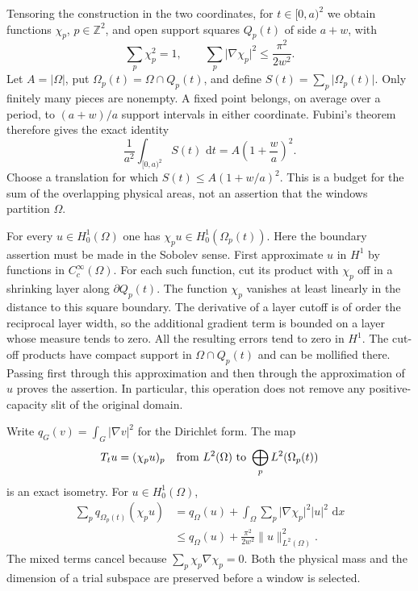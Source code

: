 \documentclass[11pt,reqno]{amsart}
\numberwithin{equation}{section}
\newcommand{\Z}{\mathbb Z}
\newcommand{\dd}{\,\mathrm d}
\newcommand{\abs}[1]{\lvert#1\rvert}
\newcommand{\norm}[1]{\lVert#1\rVert}
\newcommand{\Om}{\Omega}
\begin{document}
Tensoring the construction in the two coordinates, for
$t\in[0,a)^2$ we obtain functions $\chi_p$, $p\in\Z^2$, and
open support squares $Q_p(t)$ of side $a+w$, with
\begin{equation}
 \sum_p\chi_p^2=1,
 \qquad
 \sum_p\abs{\nabla\chi_p}^2\leq\frac{\pi^2}{2w^2}.
 \label{ims:partition}
\end{equation}
Let $A=\abs{\Om}$, put $\Om_p(t)=\Om\cap Q_p(t)$, and define
$S(t)=\sum_p\abs{\Om_p(t)}$.  Only finitely many pieces are
nonempty.  A fixed point belongs, on average over a period, to
$(a+w)/a$ support intervals in either coordinate.  Fubini's theorem
therefore gives the exact identity
\begin{equation}
 \frac1{a^2}\int_{[0,a)^2}S(t)\,\dd t
       =A\left(1+\frac wa\right)^2.
 \label{ims:area-average}
\end{equation}
Choose a translation for which
$S(t)\leq A(1+w/a)^2$.  This is a budget for the sum of the
overlapping physical areas, not an assertion that the windows
partition $\Om$.

For every $u\in H_0^1(\Om)$ one has
$\chi_pu\in H_0^1(\Om_p(t))$.  Here the boundary assertion must
be made in the Sobolev sense.  First approximate $u$ in $H^1$ by
functions in $C_c^\infty(\Om)$.  For each such function, cut its
product with $\chi_p$ off in a shrinking layer along
$\partial Q_p(t)$.  The function $\chi_p$ vanishes at least
linearly in the distance to this square boundary.  The derivative
of a layer cutoff is of order the reciprocal layer width, so the
additional gradient term is bounded on a layer whose measure tends
to zero.  All the resulting errors tend to zero in $H^1$.
The cut-off products have compact support in $\Om\cap Q_p(t)$
and can be mollified there.  Passing first through this approximation
and then through the approximation of $u$ proves the assertion.
In particular, this operation does not remove any positive-capacity
slit of the original domain.

Write $q_G(v)=\int_G\abs{\nabla v}^2$ for the Dirichlet form.
The map
\[
 T_tu=(\chi_pu)_p
 \quad\hbox{from }L^2(\Om)\hbox{ to }
       \bigoplus_pL^2(\Om_p(t))
\]
is an exact isometry.  For $u\in H_0^1(\Om)$,
\begin{equation}
 \begin{split}
 \sum_p q_{\Om_p(t)}(\chi_pu)
   &=q_{\Om}(u)+
       \int_{\Om}\sum_p\abs{\nabla\chi_p}^2\abs{u}^2\,\dd x\\
   &\leq q_{\Om}(u)+\frac{\pi^2}{2w^2}\norm{u}_{L^2(\Om)}^2.
 \end{split}
 \label{ims:identity}
\end{equation}
The mixed terms cancel because
$\sum_p\chi_p\nabla\chi_p=0$.  Both the physical mass and the
dimension of a trial subspace are preserved before a window is
selected.
\end{document}
